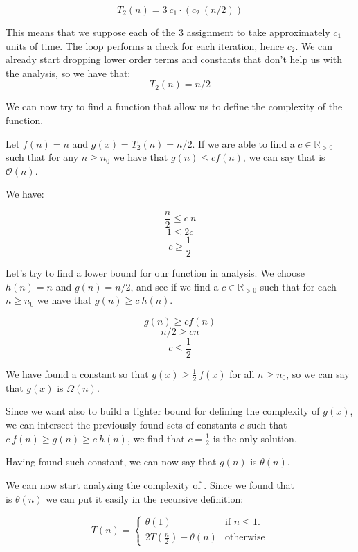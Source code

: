 \documentclass[12pt]{article}
\newcommand{\realpositivenumbers}{\mathbb{R}_{>0}} %
\newcommand{\bigO}{\mathcal{O}}
\begin{document}
$$ T_2(n) = 3\ c_1 \cdot (c_2\ (n/2))$$

This means that we suppose each of the 3 assignment to take approximately $c_1$ units of time. The loop performs a check for
each iteration, hence $c_2$.
We can already start dropping lower order terms and constants that don't help us with the analysis, so we have that:
$$ T_2(n) = n/2 $$

We can now try to find a function that allow us to define the complexity of the  function.
\vspace{1cm}

Let $f(n) = n $ and $g(x) = T_2(n) = n/2$. If we are able to find a $c \in \realpositivenumbers$ such that for 
any $n \geq n_0$ we have that $g(n) \leq cf(n)$, we can say that  is $\bigO(n)$.

We have:

$$ \frac{n}{2} \leq c\ n $$
$$ 1 \leq 2c $$
$$ c \geq \frac{1}{2} $$

Let's try to find a lower bound for our function in analysis. We choose $h(n) = n$ and $g(n) = n / 2$, and see if we find a $c \in \realpositivenumbers $ such that for each $n \geq n_0$ we have that $g(n) \geq c\ h(n)$.

$$ g(n) \geq c f(n) $$
$$ n/2 \geq c n $$
$$ c \leq \frac{1}{2} $$

We have found a constant so that $g(x) \geq \frac{1}{2}\ f(x)$ for all $n \geq n_0$, so we can say that $g(x)$ is $\Omega(n)$.
\vspace{1cm}

Since we want also to build a tighter bound for defining the complexity of $g(x)$, we can intersect the previously found sets of constants $c$ such that $c\ f(n) \geq g(n) \geq c\ h(n)$, we find that $c = \frac{1}{2}$ is the only solution.

Having found such constant, we can now say that $g(n)$ is $\theta (n)$.
\pagebreak

We can now start analyzing the complexity of . Since we found that \\  is $\theta(n)$ we 
can put it easily in the  recursive definition:

\begin{equation}
  T(n) =\begin{cases}
    \theta(1) & \text{if $n \leq 1$}.\\
    2T\left( \frac{n}{2} \right) + \theta(n) & \text{otherwise}
  \end{cases}
\end{equation}
\end{document}
